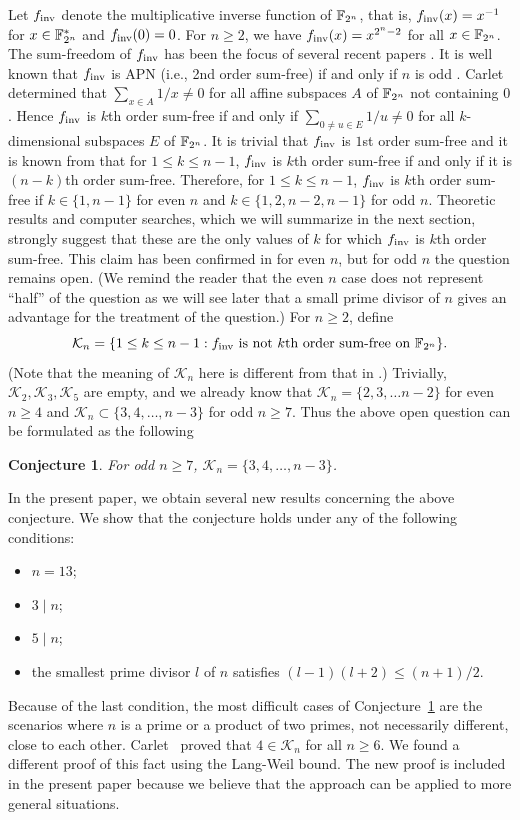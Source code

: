 \documentclass{amsart}
\newtheorem{conj}[thm]{Conjecture}
\numberwithin{equation}{section}
\theoremstyle{definition}
\newcommand{\f}{\Bbb F}
\newcommand{\fin}{f_{\text{\rm inv}}}
\begin{document}
Let $\fin$ denote the multiplicative inverse function of $\f_{2^n}$, that is, $\fin(x)=x^{-1}$ for $x\in\f_{2^n}^*$ and $\fin(0)=0$. For $n\ge 2$, we have $\fin(x)=x^{2^n-2}$ for all $x\in\f_{2^n}$. The sum-freedom of $\fin$ has been the focus of several recent papers \cite{Carlet-0,Carlet-pre,Carlet-Hou}. It is well known that $\fin$ is APN (i.e., 2nd order sum-free) if and only if $n$ is odd \cite{Nyberg-LNCS-1994}. Carlet \cite{Carlet-0} determined that $\sum_{x\in A}1/x\ne 0$ for all affine subspaces $A$ of $\f_{2^n}$ not containing $0$. Hence $\fin$ is $k$th order sum-free if and only if $\sum_{0\ne u\in E}1/u\ne 0$ for all $k$-dimensional subspaces $E$ of $\f_{2^n}$. It is trivial that $\fin$ is $1$st order sum-free and it is known from \cite{Carlet-pre} that for $1\le k\le n-1$, $\fin$ is $k$th order sum-free if and only if it is $(n-k)$th order sum-free. Therefore, for $1\le k\le n-1$, $\fin$ is $k$th order sum-free if $k\in\{1,n-1\}$ for even $n$ and $k\in\{1,2,n-2,n-1\}$ for odd $n$. Theoretic results and computer searches, which we will summarize in the next section, strongly suggest that these are the only values of $k$ for which $\fin$ is $k$th order sum-free. This claim has been confirmed in \cite{Carlet-Hou} for even $n$, but for odd $n$ the question remains open. (We remind the reader that the even $n$ case does not represent ``half'' of the question as we will see later that a small prime divisor of $n$ gives an advantage for the treatment of the question.) For $n\ge 2$, define 
\begin{equation}\label{1.1}
\mathcal K_n=\{1\le k\le n-1:\text{$\fin$ is not $k$th order sum-free on $\f_{2^n}$}\}.
\end{equation}
(Note that the meaning of $\mathcal K_n$ here is different from that in \cite{Carlet-Hou}.)
Trivially, $\mathcal K_2, \mathcal K_3,\mathcal K_5$ are empty, and we already know that $\mathcal K_n=\{2,3,\dots n-2\}$ for even $n\ge 4$ and $\mathcal K_n\subset\{3,4,\dots,n-3\}$ for odd $n\ge 7$. Thus the above open question can be formulated as the following
\begin{conj}\label{conj}
For odd $n\ge 7$, $\mathcal K_n=\{3,4,\dots,n-3\}$.
\end{conj}

In the present paper, we obtain several new results concerning the above conjecture. We show that the conjecture holds under any of the following conditions:
\begin{itemize}
\item $n=13$; 
\item $3\mid n$; 
\item $5\mid n$; 
\item the smallest prime divisor $l$ of $n$ satisfies $(l-1)(l+2)\le (n+1)/2$.
\end{itemize}
Because of the last condition, the most difficult cases of Conjecture~\ref{conj} are the scenarios where $n$ is a prime or a product of two primes, not necessarily different, close to each other.
Carlet~\cite{Carlet-pre} proved that $4\in\mathcal K_n$ for all $n\ge 6$. We found a different proof of this fact using the Lang-Weil bound. The new proof is included in the present paper because we believe that the approach can be applied to more general situations.
\end{document}

